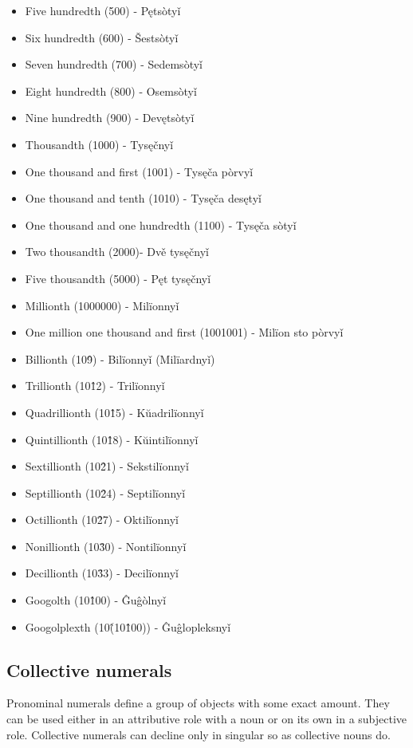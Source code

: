 \begin{itemize}
	\item Five hundredth (500) - Pętsòtyǐ
	\item Six hundredth (600) - Šestsòtyǐ
	\item Seven hundredth (700) - Sedemsòtyǐ
	\item Eight hundredth (800) - Osemsòtyǐ
	\item Nine hundredth (900) - Devętsòtyǐ
	\item Thousandth (1000) - Tysęčnyǐ
	\item One thousand and first (1001) - Tysęča pòrvyǐ
	\item One thousand and tenth (1010) - Tysęča desętyǐ
	\item One thousand and one hundredth (1100) - Tysęča sòtyǐ
	\item Two thousandth (2000)- Dvě tysęčnyǐ
	\item Five thousandth (5000) - Pęt tysęčnyǐ
	\item Millionth (1000000) - Milïonnyǐ
	\item One million one thousand and first (1001001) - Milïon sto pòrvyǐ
	\item Billionth (10\^9) - Bilïonnyǐ (Milïardnyǐ)
	\item Trillionth (10\^12) - Trilïonnyǐ
	\item Quadrillionth (10\^15) - Kŭadrilïonnyǐ
	\item Quintillionth (10\^18) - Kŭintilïonnyǐ
	\item Sextillionth (10\^21) - Sekstilïonnyǐ
	\item Septillionth (10\^24) - Septilïonnyǐ
	\item Octillionth (10\^27) - Oktilïonnyǐ
	\item Nonillionth (10\^30) - Nontilïonnyǐ
	\item Decillionth (10\^33) - Decilïonnyǐ
	\item Googolth (10\^100) - Ĝuĝòlnyǐ
	\item Googolplexth (10\^(10\^100)) - Ĝuĝlopleksnyǐ
\end{itemize}

\subsection{Collective numerals}

Pronominal numerals define a group of objects with some exact amount. They can be used either in an attributive role with a noun or on its own in a subjective role. Collective numerals can decline only in singular so as collective nouns do. 

